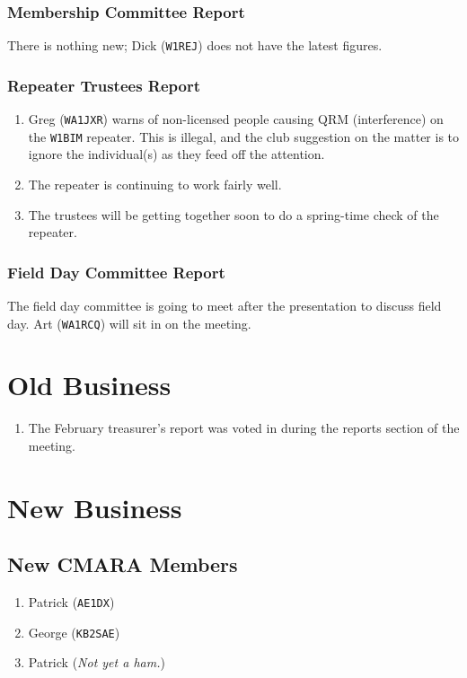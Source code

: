 \documentclass[10pt,letterpaper]{article}
\begin{document}
\subsubsection{Membership Committee Report}

There is nothing new; Dick (\texttt{W1REJ}) does not have the latest figures.

\subsubsection{Repeater Trustees Report}
\begin{enumerate}
  \item Greg (\texttt{WA1JXR}) warns of non-licensed people causing QRM (interference) on the \texttt{W1BIM} repeater. This is illegal, and the club suggestion on the matter is to ignore the individual(s) as they feed off the attention.
  \item The repeater is continuing to work fairly well.
  \item The trustees will be getting together soon to do a spring-time check of the repeater.
\end{enumerate}

\subsubsection{Field Day Committee Report}
The field day committee is going to meet after the presentation to discuss field day. Art (\texttt{WA1RCQ}) will sit in on the meeting.

\section{Old Business}
\begin{enumerate}
\item The February treasurer's report was voted in during the reports section of the meeting.
\end{enumerate}

\section{New Business}

\subsection{New CMARA Members}
\label{new-cmara-members}

\begin{enumerate}
  \item Patrick (\texttt{AE1DX})
  \item George (\texttt{KB2SAE})
  \item Patrick (\emph{Not yet a ham.})
\end{enumerate}
\end{document}
